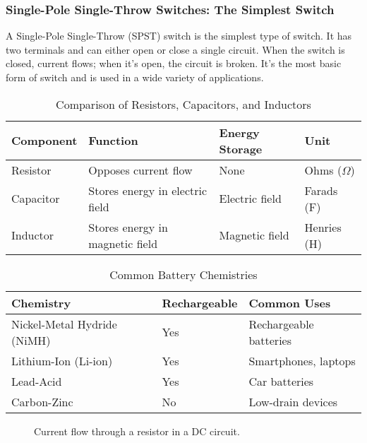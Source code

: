 \subsubsection*{Single-Pole Single-Throw Switches: The Simplest Switch}
A Single-Pole Single-Throw (SPST) switch is the simplest type of switch. It has two terminals and can either open or close a single circuit. When the switch is closed, current flows; when it's open, the circuit is broken. It's the most basic form of switch and is used in a wide variety of applications.

\begin{table}[h!]
    \centering
    \caption{Comparison of Resistors, Capacitors, and Inductors}
    \label{tab:resistor-capacitor-inductor-comparison}
    \begin{tabular}{|l|l|l|l|}
        \hline
        \textbf{Component} & \textbf{Function} & \textbf{Energy Storage} & \textbf{Unit} \\
        \hline
        Resistor & Opposes current flow & None & Ohms ($\Omega$) \\
        Capacitor & Stores energy in electric field & Electric field & Farads (F) \\
        Inductor & Stores energy in magnetic field & Magnetic field & Henries (H) \\
        \hline
    \end{tabular}
\end{table}

\begin{table}[h!]
    \centering
    \caption{Common Battery Chemistries}
    \label{tab:battery-chemistries}
    \begin{tabular}{|l|l|l|}
        \hline
        \textbf{Chemistry} & \textbf{Rechargeable} & \textbf{Common Uses} \\
        \hline
        Nickel-Metal Hydride (NiMH) & Yes & Rechargeable batteries \\
        Lithium-Ion (Li-ion) & Yes & Smartphones, laptops \\
        Lead-Acid & Yes & Car batteries \\
        Carbon-Zinc & No & Low-drain devices \\
        \hline
    \end{tabular}
\end{table}

\begin{figure}[h!]
    \centering
    \caption{Current flow through a resistor in a DC circuit.}
    \label{fig:resistor-current-flow}
\end{figure}

